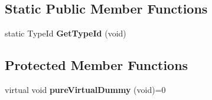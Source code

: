 \subsection*{\-Static \-Public \-Member \-Functions}
\begin{DoxyCompactItemize}
\item 
\hypertarget{classns3_1_1PLC__NoiseSource_a56ebebf6999795b86666c5cd81ddbb7a}{static \-Type\-Id {\bfseries \-Get\-Type\-Id} (void)}\label{classns3_1_1PLC__NoiseSource_a56ebebf6999795b86666c5cd81ddbb7a}

\end{DoxyCompactItemize}
\subsection*{\-Protected \-Member \-Functions}
\begin{DoxyCompactItemize}
\item 
\hypertarget{classns3_1_1PLC__NoiseSource_a0d95ad4b82a8c95cfcecab08346ccc45}{virtual void {\bfseries pure\-Virtual\-Dummy} (void)=0}\label{classns3_1_1PLC__NoiseSource_a0d95ad4b82a8c95cfcecab08346ccc45}

\end{DoxyCompactItemize}

